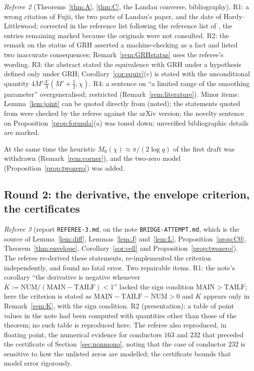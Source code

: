 \documentclass[11pt]{amsart}
\theoremstyle{definition}
\numberwithin{equation}{section}
\begin{document}
\emph{Referee 2} (Theorems~\ref{thm:A}, \ref{thm:C}, the Landau
converse, bibliography). R1: a wrong citation of Fujii, the two parts
of Landau's paper, and the date of Hardy--Littlewood; corrected in the
reference list following the reference list of \cite{PT19}, the
entries remaining marked because the originals were not consulted.
R2: the remark on the status of GRH asserted a machine-checking as a
fact and listed two inaccurate consequences;
Remark~\ref{rem:GRHstatus} uses the referee's wording. R3: the
abstract stated the equivalence with GRH under a hypothesis defined
only under GRH; Corollary~\ref{cor:equiv}(c) is stated with the
unconditional quantity $4M'\frac{\Lambda'}{\Lambda}(M'+\frac12,\chi)$.
R4: a sentence on ``a limited range of the smoothing parameter''
overgeneralised; restricted (Remark~\ref{rem:literature}). Minor
items: Lemma~\ref{lem:joint} can be quoted directly from
\cite{ANS14} (noted); the statements quoted from \cite{ANS14} were
checked by the referee against the arXiv version; the novelty sentence
on Proposition~\ref{prop:formula}(a) was toned down; unverified
bibliographic details are marked.

At the same time the heuristic $M_0(\chi)\approx\pi/(2\log q)$ of the
first draft was withdrawn (Remark~\ref{rem:corner}), and the two-zero
model (Proposition~\ref{prop:twozero}) was added.

\subsection*{Round 2: the derivative, the envelope criterion, the
certificates}

\emph{Referee 3} (report \texttt{REFEREE-3.md}, on the note
\texttt{BRIDGE-ATTEMPT.md}, which is the source of
Lemma~\ref{lem:diff}, Lemmas~\ref{lem:J} and~\ref{lem:L},
Proposition~\ref{prop:C0}, Theorem~\ref{thm:envelope},
Corollary~\ref{cor:cell} and Proposition~\ref{prop:twozero}). The
referee re-derived these statements, re-implemented the criterion
independently, and found no fatal error. Two repairable items. R1:
the note's corollary ``the derivative is negative whenever
$K:=\mathrm{NUM}/(\mathrm{MAIN}-\mathrm{TAILF})<1$'' lacked the sign
condition $\mathrm{MAIN}>\mathrm{TAILF}$; here the criterion is
stated as $\mathrm{MAIN}-\mathrm{TAILF}-\mathrm{NUM}>0$ and $K$
appears only in Remark~\ref{rem:K}, with the sign condition. R2
(presentation): a table of point values in the note had been computed
with quantities other than those of the theorem; no such table is
reproduced here. The referee also reproduced, in floating point, the
numerical evidence for conductors $163$ and $232$ that preceded the
certificate of Section~\ref{sec:nonmono}, noting that the case of
conductor $232$ is sensitive to how the unlisted zeros are modelled;
the certificate bounds that model error rigorously.
\end{document}
